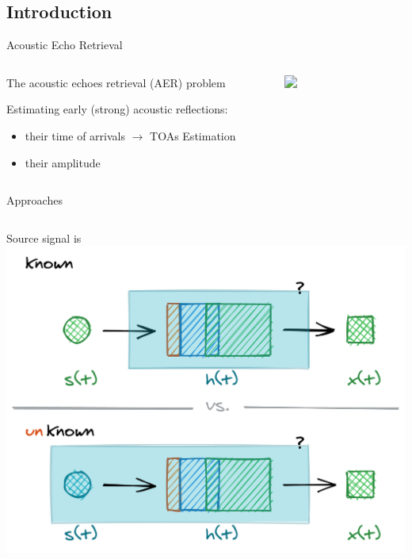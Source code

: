 \subsection{Introduction}

\begin{frame}{Acoustic Echo Retrieval}


    \begin{columns}[T,onlytextwidth]

        \begin{alertblock}{The acoustic echoes retrieval (AER) problem}

            \vspace{.1em}
            Estimating early (strong) acoustic reflections:
            \begin{itemize}
                \item their time of arrivals $\rightarrow$ TOAs Estimation
                \item their amplitude
            \end{itemize}
        \end{alertblock}

            \begin{figure}
                \centering
                \includegraphics<2->[width=\textwidth]{./figures/arrivals.png}
            \end{figure}

    \end{columns}

    \pause[3]
    \vfill
    Approaches
    \begin{columns}[T,onlytextwidth]
        \centering
        Source signal is
        \includegraphics[width=.9\textwidth]{./figures/active-passive.png}


\end{columns}
\end{frame}
